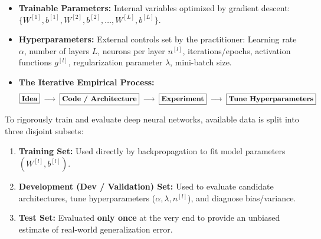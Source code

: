 \documentclass[10pt,a4paper]{article}
\begin{document}
\vspace{-2pt}

\par\vspace{1pt}
\begin{itemize}[leftmargin=10pt, itemsep=1pt, topsep=0.5pt]
    \item \textbf{Trainable Parameters:} Internal variables optimized by gradient descent:
    $\{W^{[1]}, b^{[1]}, W^{[2]}, b^{[2]}, \dots, W^{[L]}, b^{[L]}\}$.
    \item \textbf{Hyperparameters:} External controls set by the practitioner:
    Learning rate $\alpha$, number of layers $L$, neurons per layer $n^{[l]}$, iterations/epochs, activation functions $g^{[l]}$, regularization parameter $\lambda$, mini-batch size.
    \item \textbf{The Iterative Empirical Process:}
    \[
    \boxed{\text{\bfseries Idea}} \;\longrightarrow\; \boxed{\text{\bfseries Code / Architecture}} \;\longrightarrow\; \boxed{\text{\bfseries Experiment}} \;\longrightarrow\; \boxed{\text{\bfseries Tune Hyperparameters}}
    \]
\end{itemize}

\newpage


\par\vspace{1pt}
To rigorously train and evaluate deep neural networks, available data is split into three disjoint subsets:
\begin{enumerate}[leftmargin=12pt, itemsep=1pt, topsep=0.5pt]
    \item \textbf{Training Set:} Used directly by backpropagation to fit model parameters $(W^{[l]}, b^{[l]})$.
    \item \textbf{Development (Dev / Validation) Set:} Used to evaluate candidate architectures, tune hyperparameters ($\alpha, \lambda, n^{[l]}$), and diagnose bias/variance.
    \item \textbf{Test Set:} Evaluated \textbf{only once} at the very end to provide an unbiased estimate of real-world generalization error.
\end{enumerate}
\end{document}
